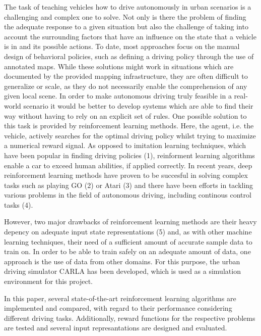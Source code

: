 \documentclass[letterpaper, 10 pt, conference]{ieeeconf}  %
\begin{document}

The task of teaching vehicles how to drive autonomously in urban scenarios is a challenging and complex one to solve. Not only is there the problem of finding the adequate response to a given situation but also the challenge of taking into account the surrounding factors that have an influence on the state that a vehicle is in and its possible actions. To date, most approaches focus on the manual design of behavioral policies, such as defining a driving policy through the use of annotated maps. While these solutions might work in situations which are documented by the provided mapping infrastructure, they are often difficult to generalize or scale, as they do not necessarily enable the comprehension of any given local scene. In order to make autonomous driving truly feasible in a real-world scenario it would be better to develop systems which are able to find their way without having to rely on an explicit set of rules. One possible solution to this task is provided by reinforcement learning methods. Here, the agent, i.e. the vehicle, actively searches for the optimal driving policy whilst trying to maximize a numerical reward signal. As opposed to imitation learning techniques, which have been popular in finding driving policies (1), reinforment learning algorithms enable a car to exceed human abilities, if applied correctly. In recent years, deep reinforcement learning methods have proven to be succesful in solving complex tasks such as playing GO (2) or Atari (3) and there have been efforts in tackling various problems in the field of autonomous driving, including continous control tasks (4).

However, two major drawbacks of reinforcement learning methods are their heavy depency on adequate input state representations (5) and, as with other machine learning techniques, their need of a sufficient amount of accurate sample data to train on. In order to be able to train safely on an adequate amount of data, one approach is the use of data from other domains. For this purpose, the urban driving simulator CARLA has been developed, which is used as a simulation environment for this project.

In this paper, several state-of-the-art reinforcement learning algorithms are implemented and compared, with regard to their performance considering different driving tasks. Additionally, reward functions for the respective problems are tested and several input represantations are designed and evaluated.
\end{document}
